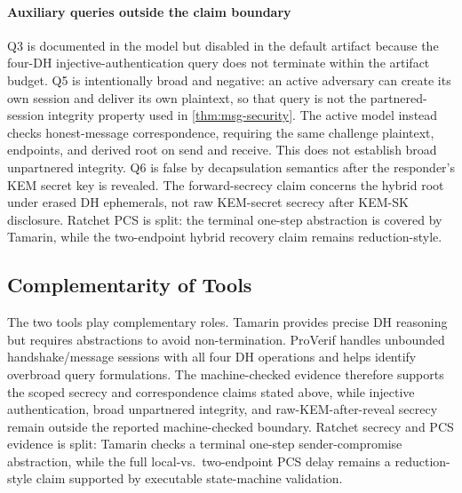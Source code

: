 \documentclass[preprint,12pt]{elsarticle}
\theoremstyle{definition}
\begin{document}
\paragraph{Auxiliary queries outside the claim boundary}
Q3 is documented in the model but disabled in the default artifact because the
four-DH injective-authentication query does not terminate within the artifact
budget. Q5 is intentionally broad and negative: an active adversary can create
its own session and deliver its own plaintext, so that query is not the
partnered-session integrity property used in \cref{thm:msg-security}. The
active model instead checks honest-message correspondence, requiring the same
challenge plaintext, endpoints, and derived root on send and receive. This does
not establish broad unpartnered integrity. Q6
is false by decapsulation semantics after the responder's KEM secret key is
revealed. The forward-secrecy claim concerns the hybrid root under erased DH
ephemerals, not raw KEM-secret secrecy after KEM-SK disclosure. Ratchet PCS is
split: the terminal one-step abstraction is covered by Tamarin, while the
two-endpoint hybrid recovery claim remains reduction-style.

\subsection{Complementarity of Tools}

The two tools play complementary roles. Tamarin provides precise DH reasoning
but requires abstractions to avoid non-termination. ProVerif handles unbounded
handshake/message sessions with all four DH operations and helps identify
overbroad query formulations. The machine-checked evidence therefore supports
the scoped secrecy and correspondence claims stated above, while injective
authentication, broad unpartnered integrity, and raw-KEM-after-reveal secrecy
remain outside the reported machine-checked boundary. Ratchet secrecy and PCS evidence is split: Tamarin
checks a terminal one-step sender-compromise abstraction, while the full
local-vs.\ two-endpoint PCS delay remains a reduction-style claim supported
by executable state-machine validation.
\end{document}
